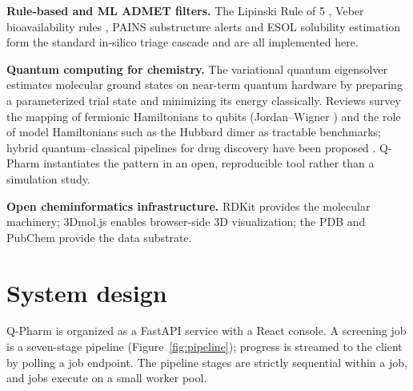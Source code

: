 \documentclass[10pt,a4paper,twocolumn]{article}
\begin{document}
\textbf{Rule-based and ML ADMET filters.} The Lipinski Rule of 5 \cite{lipinski1997},
Veber bioavailability rules \cite{veber2002}, PAINS substructure alerts
\cite{baell2010} and ESOL solubility estimation \cite{delaney2004} form the standard
in-silico triage cascade and are all implemented here.

\textbf{Quantum computing for chemistry.} The variational quantum eigensolver
\cite{peruzzo2014,kandala2017} estimates molecular ground states on near-term quantum
hardware by preparing a parameterized trial state and minimizing its energy
classically. Reviews \cite{cao2019} survey the mapping of fermionic Hamiltonians to
qubits (Jordan--Wigner \cite{jordanwigner1928}) and the role of model Hamiltonians such
as the Hubbard dimer as tractable benchmarks; hybrid quantum--classical pipelines for
drug discovery have been proposed \cite{li2024}. Q-Pharm instantiates the pattern in an
open, reproducible tool rather than a simulation study.

\textbf{Open cheminformatics infrastructure.} RDKit \cite{rdkit} provides the molecular
machinery; 3Dmol.js \cite{rego2015} enables browser-side 3D visualization; the PDB
\cite{berman2000} and PubChem \cite{kim2023} provide the data substrate.

\section{System design}
\label{sec:system}

Q-Pharm is organized as a FastAPI service with a React console. A screening job is a
seven-stage pipeline (Figure~\ref{fig:pipeline}); progress is streamed to the client by
polling a job endpoint. The pipeline stages are strictly sequential within a job, and
jobs execute on a small worker pool.
\end{document}
